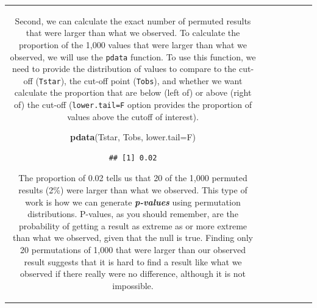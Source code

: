 \documentclass[]{book}
\newenvironment{Shaded}{\begin{snugshade}}{\end{snugshade}}
\newcommand{\KeywordTok}[1]{\textcolor[rgb]{0.13,0.29,0.53}{\textbf{#1}}}
\newcommand{\DataTypeTok}[1]{\textcolor[rgb]{0.13,0.29,0.53}{#1}}
\newcommand{\NormalTok}[1]{#1}
\theoremstyle{definition}
\theoremstyle{definition}
\theoremstyle{remark}
\begin{document}
\begin{longtable}[]{@{}ccccccc@{}}
\begin{minipage}[b]{0.10\columnwidth}
Second, we can calculate the exact number of permuted results that were
larger than what we observed. To calculate the proportion of the 1,000
values that were larger than what we observed, we will use the
\texttt{pdata} function. To use this function, we need to provide the
distribution of values to compare to the cut-off (\texttt{Tstar}), the
cut-off point (\texttt{Tobs}), and whether we want calculate the
proportion that are below (left of) or above (right of) the cut-off
(\texttt{lower.tail=F} option provides the proportion of values above
the cutoff of interest).

\begin{Shaded}
\begin{Highlighting}[]
\KeywordTok{pdata}\NormalTok{(Tstar, Tobs, }\DataTypeTok{lower.tail=}\NormalTok{F)}
\end{Highlighting}
\end{Shaded}

\begin{verbatim}
## [1] 0.02
\end{verbatim}

The proportion of 0.02 tells us that 20 of the 1,000 permuted results
(2\%) were larger than what we observed. This type of work is how we can
generate \textbf{\emph{p-values}} using permutation distributions.
P-values, as you should remember, are the probability of getting a
result as extreme as or more extreme than what we observed, given that
the null is true. Finding only 20 permutations of 1,000 that were larger
than our observed result suggests that it is hard to find a result like
what we observed if there really were no difference, although it is not
impossible.


\end{minipage}
\end{longtable}
\end{document}
